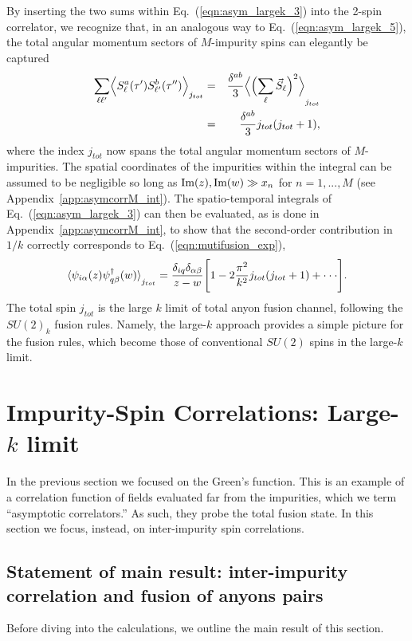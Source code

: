 \documentclass[aps,prb,twocolumn,superscriptaddress]{revtex4-1}
\begin{document}
By inserting the two sums within Eq.~(\ref{eqn:asym_largek_3}) into the 2-spin correlator, we recognize that, in an analogous way to Eq.~(\ref{eqn:asym_largek_5}), the total angular momentum sectors of $M$-impurity spins can elegantly be captured 
\begin{eqnarray}
\sum_{\ell\ell'}\Bigl\langle{S_{\ell}^{a}(\tau')S_{\ell'}^{b}(\tau'')\Bigr\rangle}_{j_{tot}}&=&\frac{\delta^{ab}}{3}\Bigl\langle{\Bigl(\sum_{\ell}\vec{S}_{\ell}\Bigr)^{2}\Bigr\rangle}_{j_{tot}} \label{eqn:asym_largek_6} \\
&=&\frac{\delta^{ab}}{3}j_{tot}(j_{tot}+1), \nonumber
\end{eqnarray}
where the index $j_{tot}$ now spans the total angular momentum sectors of $M$-impurities. The spatial coordinates of the impurities within the integral can be assumed to be negligible so long as $\textup{Im}(z),\textup{Im}(w)\gg x_{n}$ for $n=1,...,M$ (see Appendix~\ref{app:asymcorrM_int}). The spatio-temporal integrals of Eq.~(\ref{eqn:asym_largek_3}) can then be evaluated, as is done in Appendix~\ref{app:asymcorrM_int}, to show that the second-order contribution in $1/k$ correctly corresponds to Eq.~(\ref{eqn:mutifusion_exp}),
\begin{eqnarray}
\braket{\psi_{i\alpha}(z)\psi_{q\beta}^{\dagger}(w)}_{j_{tot}}=\frac{\delta_{iq}\delta_{\alpha\beta}}{z-w}\Biggl[1-2\frac{\pi^{2}}{k^{2}}j_{tot}(j_{tot}+1)+\cdot\cdot\cdot\Biggr]. \nonumber \\ \label{eqn:largek_pert}
\end{eqnarray}
The total spin $j_{tot}$ is the large $k$ limit of total anyon fusion channel, following  the $SU(2)_k$ fusion rules. Namely, the large-$k$ approach provides a simple picture for the fusion rules, which become those of conventional $SU(2)$ spins in the large-$k$ limit.


\section{Impurity-Spin Correlations: Large-$k$ limit} \label{sec:3}
In the previous section we focused on the Green's function. This is an example of a correlation function of fields evaluated far from the impurities, which we term ``asymptotic correlators.'' As such, they probe the total fusion state. In this section we  focus, instead, on inter-impurity spin correlations.

\subsection{Statement of main result: inter-impurity correlation and fusion of anyons pairs}
Before diving into the calculations, we outline the main result of this section. 
\end{document}

